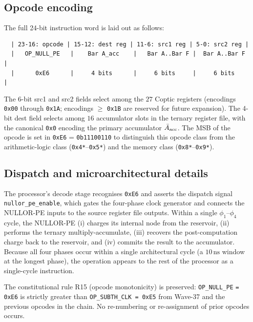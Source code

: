 \subsection{Opcode encoding}
\label{subsec:opcode_encoding}

The full 24-bit instruction word is laid out as follows:
\begin{verbatim}
  | 23-16: opcode | 15-12: dest reg | 11-6: src1 reg | 5-0: src2 reg |
  |   OP_NULL_PE   |    Bar A_acc    |   Bar A..Bar F |  Bar A..Bar F  |
  |      0xE6      |     4 bits      |     6 bits     |     6 bits     |
\end{verbatim}
The 6-bit src1 and src2 fields select among the $27$ Coptic registers (encodings
\texttt{0x00} through \texttt{0x1A}; encodings $\geq$ \texttt{0x1B} are reserved
for future expansion).  The 4-bit dest field selects among $16$ accumulator slots
in the ternary register file, with the canonical \texttt{0x0} encoding the primary
accumulator $\Bar{A}_{\text{acc}}$.  The MSB of the opcode is set in
\texttt{0xE6} = \texttt{0b11100110} to distinguish this opcode class from the
arithmetic-logic class (\texttt{0x4*}--\texttt{0x5*}) and the memory class
(\texttt{0x8*}--\texttt{0x9*}).

\subsection{Dispatch and microarchitectural details}
\label{subsec:dispatch}

The processor's decode stage recognises \texttt{0xE6} and asserts the dispatch
signal \texttt{nullor\_pe\_enable}, which gates the four-phase clock generator and
connects the NULLOR-PE inputs to the source register file outputs.  Within a single
$\phi_1$--$\phi_4$ cycle, the NULLOR-PE
(i) charges its internal node from the reservoir,
(ii) performs the ternary multiply-accumulate,
(iii) recovers the post-computation charge back to the reservoir, and
(iv) commits the result to the accumulator.  Because all four phases occur within a
single architectural cycle (a $10\,\text{ns}$ window at the longest phase),
the operation appears to the rest of the processor as a single-cycle instruction.

The constitutional rule R15 (opcode monotonicity) is preserved: \texttt{OP\_NULL\_PE}
\texttt{= 0xE6} is strictly greater than \texttt{OP\_SUBTH\_CLK = 0xE5} from Wave-37
and the previous opcodes in the chain.  No re-numbering or re-assignment of prior
opcodes occurs.

